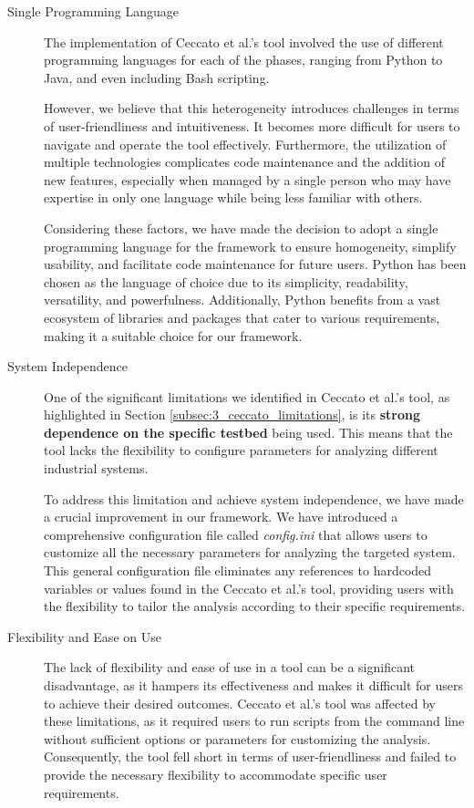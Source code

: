 \begin{description}
	\item[Single Programming Language] The implementation of Ceccato et al.'s tool involved the use of different programming languages for each of the phases, ranging from Python to Java, and even including Bash scripting.
	
	However, we believe that this heterogeneity introduces challenges in terms of user-friendliness and intuitiveness. It becomes more difficult for users to navigate and operate the tool effectively. Furthermore, the utilization of multiple technologies complicates code maintenance and the addition of new features, especially when managed by a single person who may have expertise in only one language while being less familiar with others.
	
	\bigskip
	Considering these factors, we have made the decision to adopt a single programming language for the framework to ensure homogeneity, simplify usability, and facilitate code maintenance for future users. Python has been chosen as the language of choice due to its simplicity, readability, versatility, and powerfulness. Additionally, Python benefits from a vast ecosystem of libraries and packages that cater to various requirements, making it a suitable choice for our framework.
	
	\item[System Independence] One of the significant limitations we identified in Ceccato et al.'s tool, as highlighted in Section \ref{subsec:3_ceccato_limitations}, is its \textbf{strong dependence on the specific testbed} being used. This means that the tool lacks the flexibility to configure parameters for analyzing different industrial systems.
	
	To address this limitation and achieve system independence, we have made a crucial improvement in our framework. We have introduced a comprehensive configuration file called \textit{config.ini} that allows users to customize all the necessary parameters for analyzing the targeted system. This general configuration file eliminates any references to hardcoded variables or values found in the Ceccato et al.'s tool, providing users with the flexibility to tailor the analysis according to their specific requirements.
	
	\item[Flexibility and Ease on Use] The lack of flexibility and ease of use in a tool can be a significant disadvantage, as it hampers its effectiveness and makes it difficult for users to achieve their desired outcomes. Ceccato et al.'s tool was affected by these limitations, as it required users to run scripts from the command line without sufficient options or parameters for customizing the analysis. Consequently, the tool fell short in terms of user-friendliness and failed to provide the necessary flexibility to accommodate specific user requirements.
	

\end{description}
